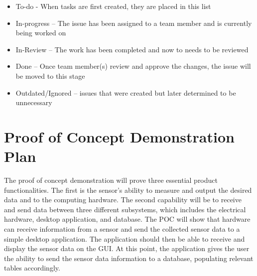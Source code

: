 \documentclass[12pt]{article}
\begin{document}
\begin{itemize}
	\item To-do - When tasks are first created, they are placed in this list
	\item In-progress – The issue has been assigned to a team member and is currently being worked on
	\item In-Review – The work has been completed and now to needs to be reviewed
	\item Done – Once team member(s) review and approve the changes, the issue will be moved to this stage
	\item Outdated/Ignored – issues that were created but later determined to be unnecessary 
\end{itemize}

\section{Proof of Concept Demonstration Plan}

The proof of concept demonstration will prove three essential product
functionalities. The first is the sensor's ability to measure and output the  
desired data and to the computing hardware. The second capability will be to receive and send 
data between three different subsystems, which includes the electrical hardware, desktop application, and database. 
The POC will show that hardware can receive information from a sensor and send the collected sensor data 
to a simple desktop application. The application should then be able to receive and display the sensor 
data on the GUI. At this point, the application gives the user the ability to send the sensor data
information to a database, populating relevant tables accordingly. 
\end{document}
